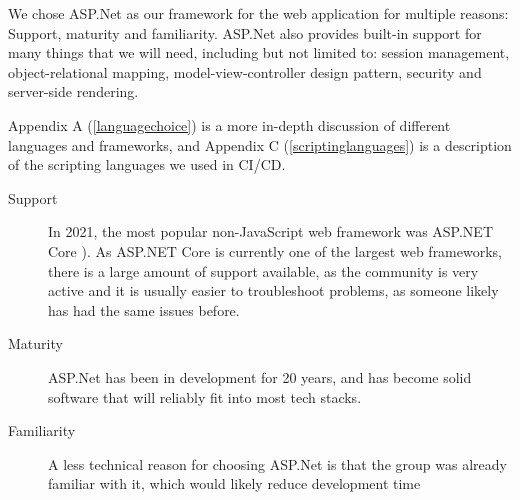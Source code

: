We chose ASP.Net as our framework for the web application for multiple reasons: Support, maturity and familiarity. ASP.Net also provides built-in support for many things that we will need, including but not limited to: session management, object-relational mapping, model-view-controller design pattern, security and server-side rendering.

Appendix A (\ref{languagechoice}) is a more in-depth discussion of different languages and frameworks, and Appendix C (\ref{scriptinglanguages}) is a description of the scripting languages we used in CI/CD.

\begin{description}
\item [Support] In 2021, the most popular non-JavaScript web framework was ASP.NET Core
\cite{so_market_share}). As ASP.NET Core is currently one of the largest web frameworks, there is a large amount of support available, as the community is very active and it is usually easier to troubleshoot problems, as someone likely has had the same issues before.
\item [Maturity] ASP.Net has been in development for 20 years, and has become solid software that will reliably fit into most tech stacks.
\item [Familiarity] A less technical reason for choosing ASP.Net is that the group was already familiar with it, which would likely reduce development time
\end{description}